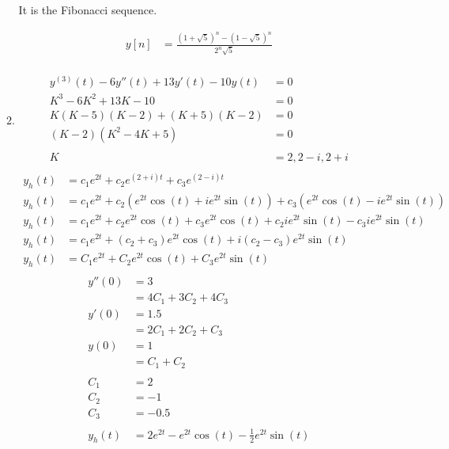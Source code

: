 \documentclass[10pt,a4paper, margin=1in]{article}
\begin{document}
\begin{enumerate}
\begin{enumerate}
    It is the Fibonacci sequence.

    \begin{align*}
        y[n] & = \frac{(1 + \sqrt{5})^n - (1 - \sqrt{5})^n}{2^n \sqrt{5}} \\
    \end{align*}

    \item %
    \begin{align*}
        y^{(3)}(t) - 6y''(t) + 13y'(t) - 10y(t) & = 0\\
        K^3 - 6K^2 + 13K - 10 & = 0\\
        K(K - 5)(K - 2) + (K + 5)(K - 2) & = 0\\
        (K - 2) (K^2 - 4K + 5) & = 0\\
        & \\
        K & = 2, 2 - i, 2 + i \\
    \end{align*}
    \begin{align*}
        y_h(t) & = c_1e^{2t} + c_2e^{(2 + i)t} + c_3e^{(2 - i)t} \\
        y_h(t) & = c_1e^{2t} + c_2\left(e^{2t}\cos(t) + ie^{2t}\sin(t)\right) + c_3\left(e^{2t}\cos(t) - ie^{2t}\sin(t)\right) \\
        y_h(t) & = c_1e^{2t} + c_2e^{2t}\cos(t) + c_3e^{2t}\cos(t) + c_2ie^{2t}\sin(t) - c_3ie^{2t}\sin(t) \\
        y_h(t) & = c_1e^{2t} + (c_2 + c_3) e^{2t}\cos(t) + i(c_2 - c_3)e^{2t}\sin(t)\\
        y_h(t) & = C_1e^{2t} + C_2e^{2t}\cos(t) + C_3e^{2t}\sin(t)\\
    \end{align*}
    \begin{align*}
        y''(0) & = 3\\
        & = 4C_1 + 3C_2 + 4C_3\\
        y'(0) & = 1.5\\
        & = 2C_1 + 2C_2 + C_3\\
        y(0) & = 1\\
        & = C_1 + C_2\\
        & \\
        C_1 & = 2\\
        C_2 & = -1\\
        C_3 & = -0.5\\
        & \\
        y_h(t) & = 2e^{2t} - e^{2t}\cos(t) - \frac{1}{2}e^{2t}\sin(t)\\
    \end{align*}
    \end{enumerate}


\end{enumerate}
\end{document}
